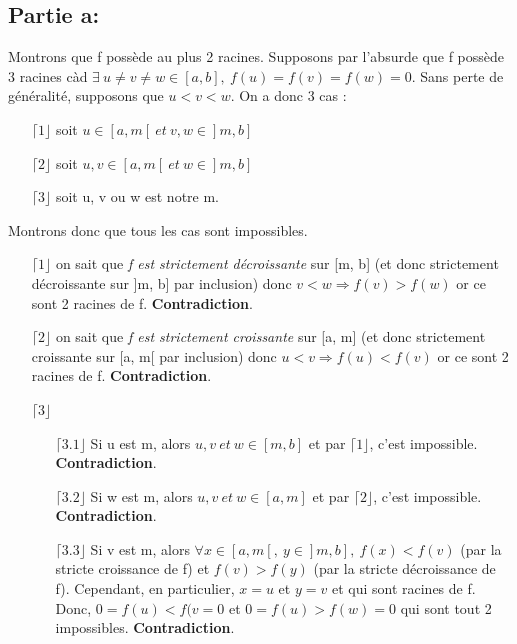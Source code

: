 \documentclass[a4paper, 12pt]{article}
\begin{document}
\subsection{Partie a:}
Montrons que f possède au plus 2 racines. \newline \newline
Supposons par l'absurde que f possède 3 racines càd \newline 
\( \exists ~ u \neq v \neq w \in [a, b], ~ f(u) = f(v) = f(w) = 0 \). \newline
Sans perte de généralité, supposons que \( u < v < w \). \newline
On a donc 3 cas :
\begin{enumerate}
	\item[\(\lceil 1 \rfloor\)] soit \( u \in [a, m[ ~ et ~ v, w \in ]m, b] \)
	\item[\(\lceil 2 \rfloor\)] soit \( u, v \in [a, m[ ~ et ~ w \in ]m, b] \)
	\item[\(\lceil 3 \rfloor\)] soit u, v ou w est notre m.
\end{enumerate}
Montrons donc que tous les cas sont impossibles.
\begin{enumerate}
	\item[\(\lceil 1 \rfloor\)] on sait que \emph{f est strictement décroissante} sur [m, b] (et donc strictement décroissante sur ]m, b] par inclusion) donc \( v < w \Rightarrow f(v) > f(w) \) or ce sont 2 racines de f. \textbf{Contradiction}.
	\item[\(\lceil 2 \rfloor\)] on sait que \emph{f est strictement croissante} sur [a, m] (et donc strictement croissante sur [a, m[ par inclusion) donc \( u < v \Rightarrow f(u) < f(v) \) or ce sont 2 racines de f. \textbf{Contradiction}.
	\item[\(\lceil 3 \rfloor\)] $~$ \newline
	\begin{enumerate}
		\item[\(\lceil 3.1 \rfloor\)] Si u est m, alors \( u, v ~ et ~ w \in [m, b] \) et par \(\lceil 1 \rfloor\), c'est impossible. \textbf{Contradiction}.
		\item[\(\lceil 3.2 \rfloor\)] Si w est m, alors \( u, v ~ et ~ w \in [a, m] \) et par \(\lceil 2 \rfloor\), c'est impossible. \textbf{Contradiction}.
		\item[\(\lceil 3.3 \rfloor\)] Si v est m, alors \( \forall x \in [a, m[, ~ y \in ]m, b], ~ f(x) < f(v) \) (par la stricte croissance de f) et \( f(v) > f(y)\) (par la stricte décroissance de f). Cependant, en particulier, \( x = u \) et \( y = v \) et qui sont racines de f. Donc, \( 0 = f(u) < f(v = 0 \) et \( 0 = f(u) > f(w) = 0 \) qui sont tout 2 impossibles. \textbf{Contradiction}. 
	\end{enumerate}
\end{enumerate}
\end{document}
